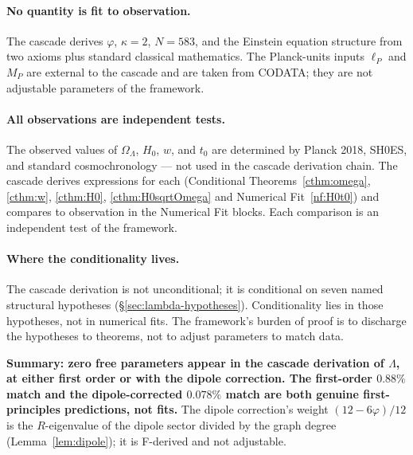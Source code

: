 \documentclass[11pt]{article}
\theoremstyle{plain}
\theoremstyle{definition}
\theoremstyle{remark}
\begin{document}
\paragraph{No quantity is fit to observation.} The cascade derives $\varphi$, $\kappa = 2$, $N = 583$, and the Einstein equation structure from two axioms plus standard classical mathematics. The Planck-units inputs $\ell_P$ and $M_P$ are external to the cascade and are taken from CODATA; they are not adjustable parameters of the framework.

\paragraph{All observations are independent tests.} The observed values of $\Omega_\Lambda$, $H_0$, $w$, and $t_0$ are determined by Planck 2018, SH0ES, and standard cosmochronology --- not used in the cascade derivation chain. The cascade derives expressions for each (Conditional Theorems~\ref{cthm:omega}, \ref{cthm:w}, \ref{cthm:H0}, \ref{cthm:H0sqrtOmega} and Numerical Fit~\ref{nf:H0t0}) and compares to observation in the Numerical Fit blocks. Each comparison is an independent test of the framework.

\paragraph{Where the conditionality lives.} The cascade derivation is not unconditional; it is conditional on seven named structural hypotheses (\S\ref{sec:lambda-hypotheses}). Conditionality lies in those hypotheses, not in numerical fits. The framework's burden of proof is to discharge the hypotheses to theorems, not to adjust parameters to match data.

\textbf{Summary: zero free parameters appear in the cascade derivation of $\Lambda$, at either first order or with the dipole correction. The first-order $0.88\%$ match and the dipole-corrected $0.078\%$ match are both genuine first-principles predictions, not fits.} The dipole correction's weight $(12-6\varphi)/12$ is the $R$-eigenvalue of the dipole sector divided by the graph degree (Lemma~\ref{lem:dipole}); it is F-derived and not adjustable.
\end{document}
